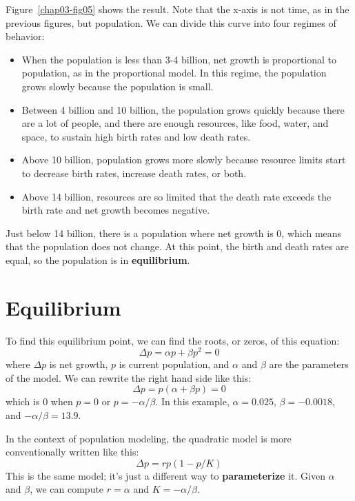 \documentclass[12pt]{book}
\theoremstyle{exercise}
\begin{document}
Figure~\ref{chap03-fig05} shows the result.  Note that the x-axis is not time, as in the previous figures, but population.  We can divide this curve into four regimes of behavior:

\begin{itemize}

\item When the population is less than 3-4 billion, net growth is proportional to population, as in the proportional model.  In this regime,  the population grows slowly because the population is small.

\item Between 4 billion and 10 billion, the population grows quickly because there are a lot of people, and there are enough resources, like food, water, and space, to sustain high birth rates and low death rates.

\item Above 10 billion, population grows more slowly because resource limits start to decrease birth rates, increase death rates, or both.

\item Above 14 billion, resources are so limited that the death rate exceeds the birth rate and net growth becomes negative.

\end{itemize}

Just below 14 billion, there is a population where net growth is 0, which means that the population does not change.  At this point, the birth and death rates are equal, so the population is in {\bf equilibrium}.


\section{Equilibrium}
\label{equilibrium}

To find this equilibrium point, we can find the roots, or zeros, of this equation:
%
\[ \Delta p = \alpha p + \beta p^2 = 0 \]
%
where $\Delta p$ is net growth, $p$ is current population, and $\alpha$ and $\beta$ are the parameters of the model.  We can rewrite the right hand side like this:
%
\[ \Delta p = p (\alpha + \beta p) = 0 \]
%
which is $0$ when $p=0$ or $p=-\alpha/\beta$.  In this example, $\alpha = 0.025$, $\beta = -0.0018$, and $-\alpha/\beta = 13.9$.

In the context of population modeling, the quadratic model is more conventionally written like this:
%
\[ \Delta p = r p (1 - p / K) \]
%
This is the same model; it's just a different way to {\bf parameterize} it.  Given $\alpha$ and $\beta$, we can compute $r=\alpha$ and $K=-\alpha/\beta$.
\end{document}
